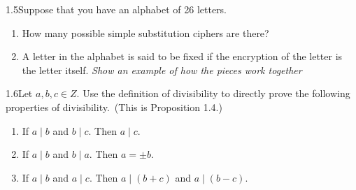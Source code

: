 \begin{exercise}
    {1.5}Suppose that you have an alphabet of 26 letters.
    \begin{enumerate}
        \item How many possible simple substitution ciphers are there?
        \item A letter in the alphabet is said to be fixed if the encryption of the letter is the letter itself. \textit{Show an example of how the pieces work together}
    \end{enumerate}
\end{exercise}


\begin{exercise}
    {1.6}Let \(a, b, c \in Z\). Use the definition of divisibility to directly prove the following properties of divisibility.\ (This is Proposition 1.4.)
    \begin{enumerate}
        \item If \(a \mid b\) and \(b \mid c\). Then \(a \mid c\).
        \item If \(a \mid b\) and \(b \mid a\). Then \(a = \pm b\).
        \item If \(a \mid b\) and \(a \mid c\). Then \(a \mid (b + c)\) and \(a \mid (b - c)\).
    \end{enumerate}
\end{exercise}

